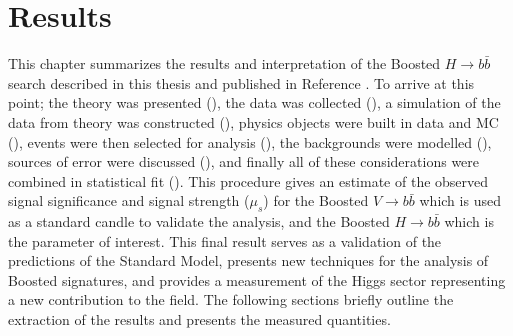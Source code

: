 \chapter{Results} \label{chap:results}

This chapter summarizes the results and interpretation of the Boosted $H
\rightarrow b\bar{b}$ search described in this thesis and published in
Reference \cite{ATLAS-CONF-2018-052}.  To arrive at this point; the theory was
presented (), the data was collected
(), a simulation of the data from theory was
constructed (), physics objects were built in data and MC
(), events were then selected for analysis
(), the backgrounds were modelled
(), sources of error were discussed
(), and finally all of these considerations were
combined in statistical fit (). This procedure gives an estimate
of the observed signal significance and signal strength ($\mu_{s}$) for the
Boosted $V \rightarrow b\bar{b}$ which is used as a standard candle to validate
the analysis, and the Boosted $H \rightarrow b\bar{b}$ which is the parameter
of interest. This final result serves as a validation of the predictions of the
Standard Model, presents new techniques for the analysis of Boosted signatures,
and provides a measurement of the Higgs sector representing a new contribution
to the field. The following sections briefly outline the extraction of the
results and presents the measured quantities.




